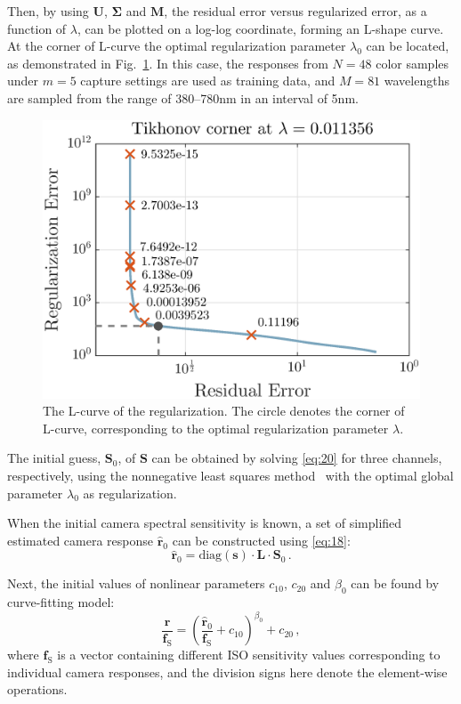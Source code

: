 \documentclass[9pt,twocolumn,twoside]{osajnl}
\begin{document}
Then, by using $\mathbf{U}$, $\mathbf{\Sigma}$ and $\mathbf{M}$, the residual error versus regularized error, as a function of $\lambda$, can be plotted on a log-log coordinate, forming an L-shape curve. At the corner of L-curve the optimal regularization parameter $\lambda_0$ can be located, as demonstrated in Fig.~\ref{fig:6}. In this case, the responses from $N=48$ color samples under $m=5$ capture settings are used as training data, and $M=81$ wavelengths are sampled from the range of 380--780nm in an interval of 5nm.

\begin{figure}[tbp]
	\centering
	\includegraphics[width=.75\linewidth]{Fig6}
	\caption{The L-curve of the regularization. The circle denotes the corner of  L-curve, corresponding to the optimal regularization parameter $\lambda$.}
	\label{fig:6}
\end{figure}

The initial guess, $\mathbf{S}_0$, of $\mathbf{S}$ can be obtained by solving \eqref{eq:20} for three channels, respectively, using the nonnegative least squares method~\cite{Lawson:95} with the optimal global parameter $\lambda_0$ as regularization.

When the initial camera spectral sensitivity is known, a set of simplified estimated camera response $\hat{\mathbf{r}}_0$ can be constructed using \eqref{eq:18}:
\begin{equation}
\hat{\mathbf{r}}_0 = \text{diag}(\mathbf{s})\cdot\mathbf{L}\cdot\mathbf{S}_0\,.
\label{eq:23}
\end{equation}

Next, the initial values of nonlinear parameters $c_{10}$, $c_{20}$ and $\beta_0$ can be found by curve-fitting model:
\begin{equation}
\frac{\mathbf{r}}{\mathbf{f}_\text{S}} = \left(\frac{\hat{\mathbf{r}}_0}{\mathbf{f}_\text{S}} + c_{10}\right)^{\beta_0} + c_{20}\,,
\label{eq:24}
\end{equation}
where $\mathbf{f}_\text{S}$ is a vector containing different ISO sensitivity values corresponding to individual camera responses, and the division signs here denote the element-wise operations.
\end{document}
